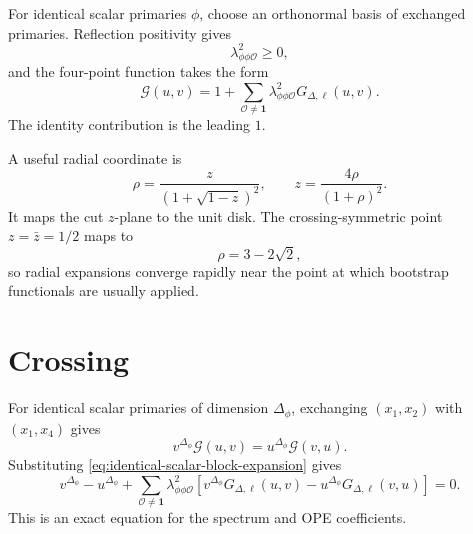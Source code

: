 For identical scalar primaries \(\phi\), choose an orthonormal basis of
exchanged primaries.  Reflection positivity gives
\[
  \lambda_{\phi\phi\mathcal O}^2\ge0,
\]
and the four-point function takes the form
\begin{equation}
  \mathcal G(u,v)
  =
  1+
  \sum_{\mathcal O\ne\mathbf 1}
  \lambda_{\phi\phi\mathcal O}^2
  G_{\Delta,\ell}(u,v).
  \label{eq:identical-scalar-block-expansion}
\end{equation}
The identity contribution is the leading \(1\).

A useful radial coordinate is
\begin{equation}
  \rho=
  \frac{z}{(1+\sqrt{1-z})^2},
  \qquad
  z=\frac{4\rho}{(1+\rho)^2}.
  \label{eq:rho-coordinate}
\end{equation}
It maps the cut \(z\)-plane to the unit disk.  The crossing-symmetric point
\(z=\bar z=1/2\) maps to
\[
  \rho=3-2\sqrt2,
\]
so radial expansions converge rapidly near the point at which bootstrap
functionals are usually applied.

\section{Crossing}

For identical scalar primaries of dimension \(\Delta_\phi\), exchanging
\((x_1,x_2)\) with \((x_1,x_4)\) gives
\begin{equation}
  v^{\Delta_\phi}\mathcal G(u,v)
  =
  u^{\Delta_\phi}\mathcal G(v,u).
  \label{eq:identical-scalar-crossing}
\end{equation}
Substituting \eqref{eq:identical-scalar-block-expansion} gives
\begin{equation}
  v^{\Delta_\phi}-u^{\Delta_\phi}
  +
  \sum_{\mathcal O\ne\mathbf 1}
  \lambda_{\phi\phi\mathcal O}^2
  \left[
    v^{\Delta_\phi}G_{\Delta,\ell}(u,v)
    -
    u^{\Delta_\phi}G_{\Delta,\ell}(v,u)
  \right]
  =
  0.
  \label{eq:crossing-block-form}
\end{equation}
This is an exact equation for the spectrum and OPE coefficients.

